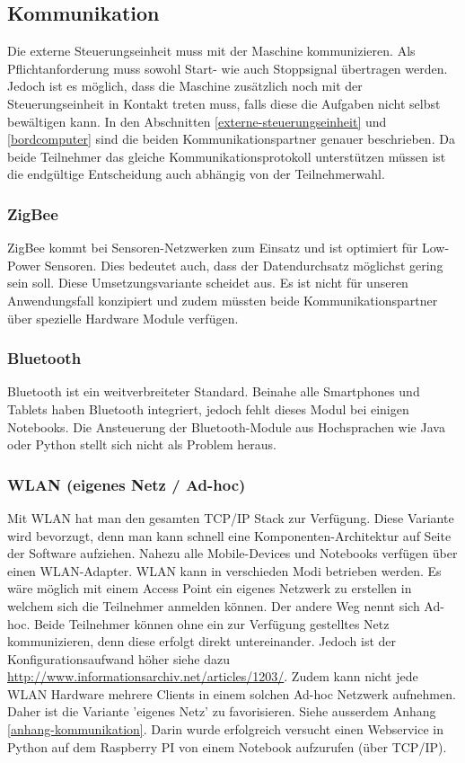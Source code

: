 \subsection{Kommunikation}
Die externe Steuerungseinheit muss mit der Maschine kommunizieren. Als Pflichtanforderung muss sowohl Start- wie auch Stoppsignal übertragen werden. Jedoch ist es möglich, dass die Maschine zusätzlich noch mit der Steuerungseinheit in Kontakt treten muss, falls diese die Aufgaben nicht selbst bewältigen kann. In den Abschnitten \ref{externe-steuerungseinheit} und \ref{bordcomputer} sind die beiden Kommunikationspartner genauer beschrieben. Da beide Teilnehmer das gleiche Kommunikationsprotokoll unterstützen müssen ist die endgültige Entscheidung auch abhängig von der Teilnehmerwahl. 

\subsubsection{ZigBee}
ZigBee kommt bei Sensoren-Netzwerken zum Einsatz und ist optimiert für Low-Power Sensoren. Dies bedeutet auch, dass der Datendurchsatz möglichst gering sein soll. Diese Umsetzungsvariante scheidet aus. Es ist nicht für unseren Anwendungsfall konzipiert und zudem müssten beide Kommunikationspartner über spezielle Hardware Module verfügen.

\subsubsection{Bluetooth}
Bluetooth ist ein weitverbreiteter Standard. Beinahe alle Smartphones und Tablets haben Bluetooth integriert, jedoch fehlt dieses Modul bei einigen Notebooks. Die Ansteuerung der Bluetooth-Module aus Hochsprachen wie Java oder Python stellt sich nicht als Problem heraus.

\subsubsection{WLAN (eigenes Netz / Ad-hoc)}
Mit WLAN hat man den gesamten TCP/IP Stack zur Verfügung. Diese Variante wird bevorzugt, denn man kann schnell eine Komponenten-Architektur auf Seite der Software aufziehen. Nahezu alle Mobile-Devices und Notebooks verfügen über einen WLAN-Adapter.\newline
WLAN kann in verschieden Modi betrieben werden. Es wäre möglich mit einem Access Point ein eigenes Netzwerk zu erstellen in welchem sich die Teilnehmer anmelden können. Der andere Weg nennt sich Ad-hoc. Beide Teilnehmer können ohne ein zur Verfügung gestelltes Netz kommunizieren, denn diese erfolgt direkt untereinander. Jedoch ist der Konfigurationsaufwand höher siehe dazu \href{http://www.informationsarchiv.net/articles/1203/}{http://www.informationsarchiv.net/articles/1203/}. Zudem kann nicht jede WLAN Hardware mehrere Clients in einem solchen Ad-hoc Netzwerk aufnehmen. Daher ist die Variante 'eigenes Netz' zu favorisieren.\newline
\newline
Siehe ausserdem Anhang \ref{anhang-kommunikation}. Darin wurde erfolgreich versucht einen Webservice in Python auf dem Raspberry PI von einem Notebook aufzurufen (über TCP/IP).
